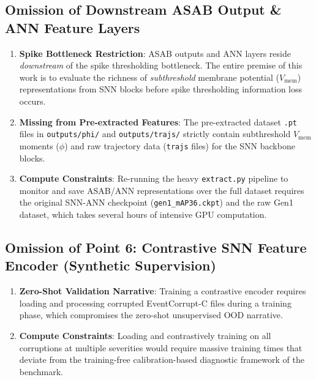 \documentclass[11pt,a4paper]{article}
\begin{document}
\subsection{Omission of Downstream ASAB Output \& ANN Feature Layers}
\begin{enumerate}
    \item \textbf{Spike Bottleneck Restriction}: ASAB outputs and ANN layers reside \textit{downstream} of the spike thresholding bottleneck. The entire premise of this work is to evaluate the richness of \textit{subthreshold} membrane potential ($V_{\mathrm{mem}}$) representations from SNN blocks before spike thresholding information loss occurs.
    \item \textbf{Missing from Pre-extracted Features}: The pre-extracted dataset \texttt{.pt} files in \texttt{outputs/phi/} and \texttt{outputs/trajs/} strictly contain subthreshold $V_{\mathrm{mem}}$ moments ($\phi$) and raw trajectory data (\texttt{trajs} files) for the SNN backbone blocks.
    \item \textbf{Compute Constraints}: Re-running the heavy \texttt{extract.py} pipeline to monitor and save ASAB/ANN representations over the full dataset requires the original SNN-ANN checkpoint (\texttt{gen1\_mAP36.ckpt}) and the raw Gen1 dataset, which takes several hours of intensive GPU computation.
\end{enumerate}

\subsection{Omission of Point 6: Contrastive SNN Feature Encoder (Synthetic Supervision)}
\begin{enumerate}
    \item \textbf{Zero-Shot Validation Narrative}: Training a contrastive encoder requires loading and processing corrupted EventCorrupt-C files during a training phase, which compromises the zero-shot unsupervised OOD narrative.
    \item \textbf{Compute Constraints}: Loading and contrastively training on all corruptions at multiple severities would require massive training times that deviate from the training-free calibration-based diagnostic framework of the benchmark.
\end{enumerate}
\end{document}

